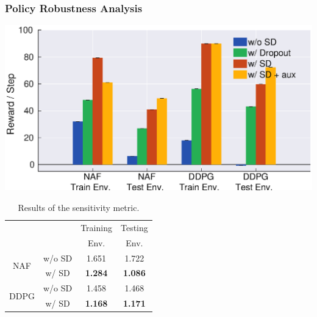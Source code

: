 \documentclass[../thesis.tex]{subfiles}
\begin{document}
 
\subsubsection{Policy Robustness Analysis}
 
\begin{table}[t]
  \begin{minipage}[t]{0.45\linewidth}
	\centering
	\vskip -0.1in
	\includegraphics[width=\columnwidth]{./MultimodalDRL/fig/random_sensor_failure_normalize_with_aux}
	\label{fig:random_sensor_failure}
  \end{minipage}
  \begin{minipage}[t]{0.45\linewidth}
	\vskip -0.1in
	\caption{Results of the sensitivity metric.} %
	\label{table:policy-ratio}
	\vskip 0.1in
	\centering
	\begin{small}
	\begin{sc}
	\begin{tabular}{cccc}
	\toprule
    \centering
 	& & Training & Testing  \\
     & & Env. & Env. \\ \midrule \midrule
	\multirow{2}{*}{NAF}  & w/o SD & 1.651 & 1.722 \\
                      	& w/ SD  & \textbf{1.284} & \textbf{1.086} \\ \midrule
	\multirow{2}{*}{DDPG} & w/o SD & 1.458 & 1.468 \\
                      	& w/ SD  & \textbf{1.168} & \textbf{1.171} \\ \toprule
	\end{tabular}
	\end{sc}
	\end{small}
  \end{minipage}
\end{table}
 
\end{document}

